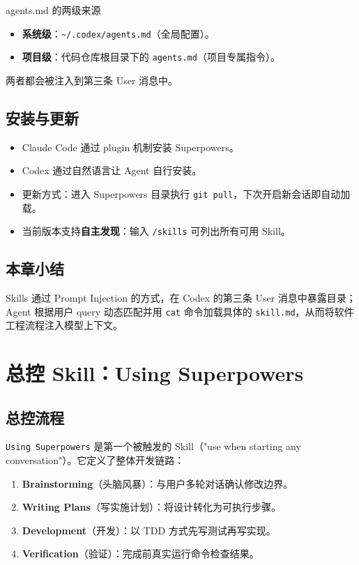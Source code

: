 \documentclass[a4paper]{article}
\begin{document}
\begin{knowledgebox}{agents.md 的两级来源}
\begin{itemize}
    \item \textbf{系统级}：\texttt{\~{}/.codex/agents.md}（全局配置）。
    \item \textbf{项目级}：代码仓库根目录下的 \texttt{agents.md}（项目专属指令）。
\end{itemize}
两者都会被注入到第三条 User 消息中。
\end{knowledgebox}

\subsection{安装与更新}

\begin{itemize}
    \item Claude Code 通过 plugin 机制安装 Superpowers。
    \item Codex 通过自然语言让 Agent 自行安装。
    \item 更新方式：进入 Superpowers 目录执行 \texttt{git pull}，下次开启新会话即自动加载。
    \item 当前版本支持\textbf{自主发现}：输入 \texttt{/skills} 可列出所有可用 Skill。
\end{itemize}

\subsection{本章小结}

Skills 通过 Prompt Injection 的方式，在 Codex 的第三条 User 消息中暴露目录；Agent 根据用户 query 动态匹配并用 \texttt{cat} 命令加载具体的 \texttt{skill.md}，从而将软件工程流程注入模型上下文。


\section{总控 Skill：Using Superpowers}

\subsection{总控流程}

\texttt{Using Superpowers} 是第一个被触发的 Skill（"use when starting any conversation"）。它定义了整体开发链路：

\begin{enumerate}
    \item \textbf{Brainstorming}（头脑风暴）：与用户多轮对话确认修改边界。
    \item \textbf{Writing Plans}（写实施计划）：将设计转化为可执行步骤。
    \item \textbf{Development}（开发）：以 TDD 方式先写测试再写实现。
    \item \textbf{Verification}（验证）：完成前真实运行命令检查结果。
\end{enumerate}
\end{document}
